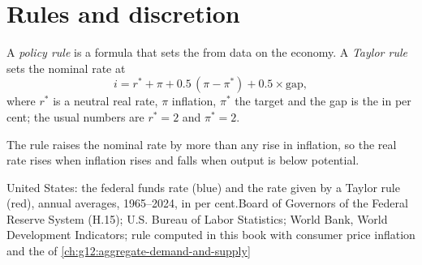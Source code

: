 \section{Rules and discretion}\label{sec:g12:monetary-policy:rules}

\begin{definition}\label{def:g12:monetary-policy:policy-rule}
A \emph{policy rule} is a formula that sets the  from data on the economy. A \emph{Taylor rule}%
\label{def:g12:monetary-policy:taylor-rule} sets the nominal rate at
\[ i = r^* + \pi + 0.5\,(\pi - \pi^*) + 0.5 \times \text{gap}, \]
where $r^*$ is a neutral real rate, $\pi$ inflation, $\pi^*$ the target and the gap is the  in per cent; the usual numbers are $r^* = 2$ and $\pi^* = 2$.
\end{definition}

The rule raises the nominal rate by more than any rise in inflation, so the real rate rises when inflation rises and falls when output is below potential.

\begin{omchart}{United States: the federal funds rate (blue) and the rate given by a Taylor rule (red), annual averages, 1965--2024, in per cent.}{Board of Governors of the
Federal Reserve System (H.15); U.S. Bureau of Labor Statistics; World Bank, World Development Indicators; rule computed in this book with consumer price inflation and the
 of \cref{ch:g12:aggregate-demand-and-supply}}
\end{omchart}

